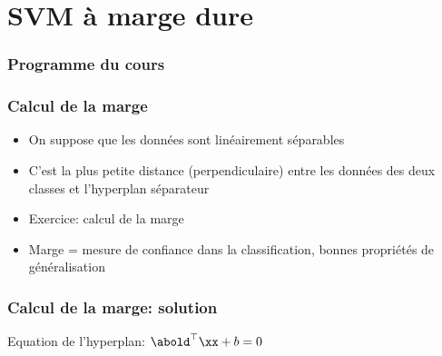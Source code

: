 \documentclass[9pt,table]{beamer} %
\begin{document}
\section{SVM à marge dure}

\begin{frame}
\frametitle{Programme du cours}
\tableofcontents[currentsection]
\end{frame}


\begin{frame}
\frametitle{Calcul de la marge}

\begin{itemize}[label=\tiny$\blacksquare$]
	\item On suppose que les données sont linéairement séparables

	\item
	\begin{defn}[Marge]
		C'est la plus petite distance (perpendiculaire) entre les données des deux classes et l'hyperplan séparateur
	\end{defn}

	\myfig{
		
	}
	
	\item Exercice: calcul de la marge
	
	\item Marge = mesure de confiance dans la classification, bonnes propriétés de généralisation
	
\end{itemize}
\end{frame}

\begin{frame}
\frametitle{Calcul de la marge: solution}


	\myfig{
		
	}
	
	Equation de l'hyperplan: $\abold^\top \xx + b = 0$
	
\end{frame}
\end{document}
